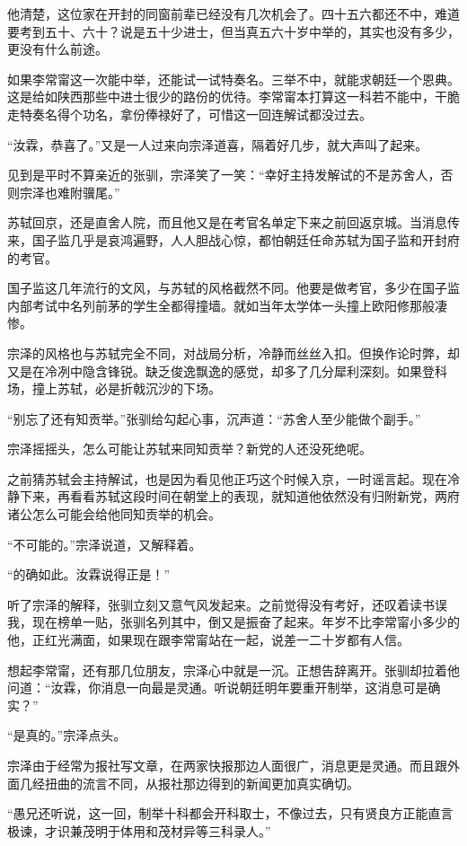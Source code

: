 他清楚，这位家在开封的同窗前辈已经没有几次机会了。四十五六都还不中，难道要考到五十、六十？说是五十少进士，但当真五六十岁中举的，其实也没有多少，更没有什么前途。

如果李常甯这一次能中举，还能试一试特奏名。三举不中，就能求朝廷一个恩典。这是给如陕西那些中进士很少的路份的优待。李常甯本打算这一科若不能中，干脆走特奏名得个功名，拿份俸禄好了，可惜这一回连解试都没过去。

“汝霖，恭喜了。”又是一人过来向宗泽道喜，隔着好几步，就大声叫了起来。

见到是平时不算亲近的张驯，宗泽笑了一笑：“幸好主持发解试的不是苏舍人，否则宗泽也难附骥尾。”

苏轼回京，还是直舍人院，而且他又是在考官名单定下来之前回返京城。当消息传来，国子监几乎是哀鸿遍野，人人胆战心惊，都怕朝廷任命苏轼为国子监和开封府的考官。

国子监这几年流行的文风，与苏轼的风格截然不同。他要是做考官，多少在国子监内部考试中名列前茅的学生全都得撞墙。就如当年太学体一头撞上欧阳修那般凄惨。

宗泽的风格也与苏轼完全不同，对战局分析，冷静而丝丝入扣。但换作论时弊，却又是在冷冽中隐含锋锐。缺乏俊逸飘逸的感觉，却多了几分犀利深刻。如果登科场，撞上苏轼，必是折戟沉沙的下场。

“别忘了还有知贡举。”张驯给勾起心事，沉声道：“苏舍人至少能做个副手。”

宗泽摇摇头，怎么可能让苏轼来同知贡举？新党的人还没死绝呢。

之前猜苏轼会主持解试，也是因为看见他正巧这个时候入京，一时谣言起。现在冷静下来，再看看苏轼这段时间在朝堂上的表现，就知道他依然没有归附新党，两府诸公怎么可能会给他同知贡举的机会。

“不可能的。”宗泽说道，又解释着。

“的确如此。汝霖说得正是！”

听了宗泽的解释，张驯立刻又意气风发起来。之前觉得没有考好，还叹着读书误我，现在榜单一贴，张驯名列其中，倒又是振奋了起来。年岁不比李常甯小多少的他，正红光满面，如果现在跟李常甯站在一起，说差一二十岁都有人信。

想起李常甯，还有那几位朋友，宗泽心中就是一沉。正想告辞离开。张驯却拉着他问道：“汝霖，你消息一向最是灵通。听说朝廷明年要重开制举，这消息可是确实？”

“是真的。”宗泽点头。

宗泽由于经常为报社写文章，在两家快报那边人面很广，消息更是灵通。而且跟外面几经扭曲的流言不同，从报社那边得到的新闻更加真实确切。

“愚兄还听说，这一回，制举十科都会开科取士，不像过去，只有贤良方正能直言极谏，才识兼茂明于体用和茂材异等三科录人。”

